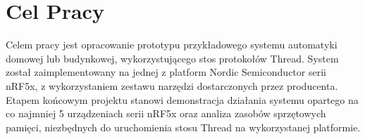 \chapter*{Cel Pracy}
\label{cha:cel}

Celem pracy jest opracowanie prototypu przykładowego systemu automatyki domowej lub budynkowej, wykorzystującego stos protokołów Thread. System został zaimplementowany na jednej z platform Nordic Semiconductor serii nRF5x, z wykorzystaniem zestawu narzędzi dostarczonych przez producenta. Etapem końcowym projektu stanowi demonstracja działania systemu opartego na co najmniej 5 urządzeniach serii nRF5x oraz analiza zasobów sprzętowych pamięci, niezbędnych do uruchomienia stosu Thread na wykorzystanej platformie.
